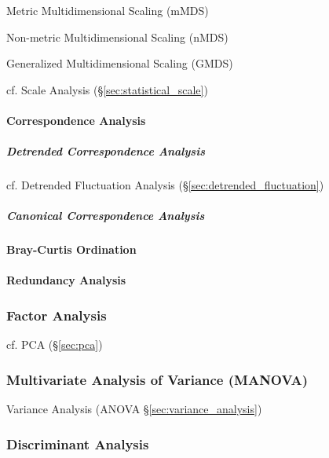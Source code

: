Metric Multidimensional Scaling (mMDS)

Non-metric Multidimensional Scaling (nMDS)

Generalized Multidimensional Scaling (GMDS)

cf. Scale Analysis (\S\ref{sec:statistical_scale})



\paragraph{Correspondence Analysis}\label{sec:correspondence_analysis}\hfill

\subparagraph{Detrended Correspondence Analysis}
\label{sec:detrended_correspondence}\hfill

\fist cf. Detrended Fluctuation Analysis (\S\ref{sec:detrended_fluctuation})



\subparagraph{Canonical Correspondence Analysis}
\label{sec:canonical_correspondence}\hfill



\paragraph{Bray-Curtis Ordination}\label{sec:bray_curtis_ordination}\hfill

\paragraph{Redundancy Analysis}\label{sec:redundancy_analysis}\hfill



\subsubsection{Factor Analysis}\label{sec:factor_analysis}

cf. PCA (\S\ref{sec:pca})



\subsubsection{Multivariate Analysis of Variance (MANOVA)}\label{sec:manova}

Variance Analysis (ANOVA \S\ref{sec:variance_analysis})



\subsubsection{Discriminant Analysis}\label{sec:discriminant_analysis}



